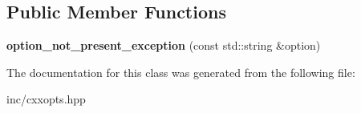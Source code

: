 \subsection*{Public Member Functions}
\begin{DoxyCompactItemize}
\item 
{\bfseries option\+\_\+not\+\_\+present\+\_\+exception} (const std\+::string \&option)\hypertarget{classcxxopts_1_1option__not__present__exception_ade0b732924a309c3823367cbe403f1d3}{}\label{classcxxopts_1_1option__not__present__exception_ade0b732924a309c3823367cbe403f1d3}

\end{DoxyCompactItemize}


The documentation for this class was generated from the following file\+:\begin{DoxyCompactItemize}
\item 
inc/cxxopts.\+hpp\end{DoxyCompactItemize}
